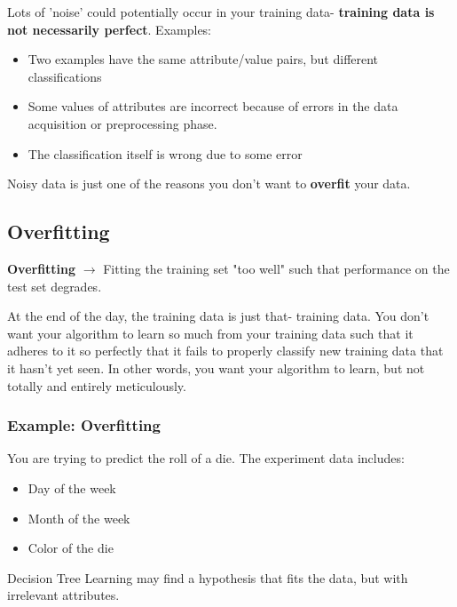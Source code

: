 \documentclass[english, 10pt]{article}
\begin{document}
Lots of 'noise' could potentially occur in your training data- \textbf{training data is not necessarily perfect}. Examples:

\begin{itemize}
	\item Two examples have the same attribute/value pairs, but different classifications
	\item Some values of attributes are incorrect because of errors in the data acquisition or preprocessing phase.
	\item The classification itself is wrong due to some error
\end{itemize}

Noisy data is just one of the reasons you don't want to \textbf{overfit} your data.

\subsection{Overfitting}

\hfill \begin{tcolorbox}[title=Definition:,colframe=red!75!black,colback=red!5!white,arc=0pt,fonttitle=\bfseries]
\textbf{Overfitting} $\rightarrow$ Fitting the training set "too well" such that performance on the test set degrades.
\end{tcolorbox}

At the end of the day, the training data is just that- training data. You don't want your algorithm to learn so much from your training data such that it adheres to it so perfectly that it fails to properly classify new training data that it hasn't yet seen. In other words, you want your algorithm to learn, but not totally and entirely meticulously.

\subsubsection{Example: Overfitting}

\begin{myproof}
You are trying to predict the roll of a die. The experiment data includes:
\begin{itemize}
	\item Day of the week
	\item Month of the week
	\item Color of the die
\end{itemize}
\end{myproof}

Decision Tree Learning may find a hypothesis that fits the data, but with irrelevant attributes.\\
\end{document}
